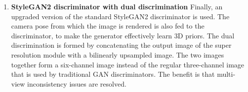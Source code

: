 \begin{enumerate}
    \item \textbf{StyleGAN2 discriminator with dual discrimination}
    Finally, an upgraded version of the standard StyleGAN2 discriminator is used. The camera pose from which the image is rendered is also fed to the discriminator, to make the generator effectively learn 3D priors. The dual discrimination is formed by concatenating the output image of the super resolution module with a bilinearly upsampled image. The two images together form a six-channel image instead of the regular three-channel image that is used by traditional GAN discriminators. The benefit is that multi-view inconsistency issues are resolved.
    
\end{enumerate}